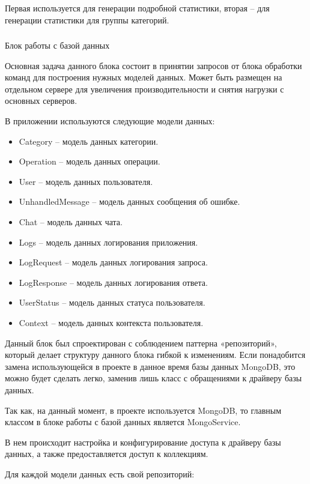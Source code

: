 Первая используется для генерации подробной статистики, вторая – для
генерации статистики для группы категорий.

\subsubsection{} Блок работы с базой данных
\label{sec:design:server:db}

Основная задача данного блока состоит в принятии запросов от блока
обработки команд для построения нужных моделей данных. Может быть
размещен на отдельном сервере для увеличения производительности и снятия нагрузки с основных серверов.

В приложении используются следующие модели данных:

\begin{itemize}
	\item Category – модель данных категории.
	\item Operation – модель данных операции.
	\item User – модель данных пользователя.
	\item UnhandledMessage – модель данных сообщения об ошибке.
	\item Chat – модель данных чата.
	\item Logs – модель данных логирования приложения.
	\item LogRequest – модель данных логирования запроса.
	\item LogResponse – модель данных логирования ответа.
	\item UserStatus – модель данных статуса пользователя.
	\item Context – модель данных контекста пользователя.
\end{itemize}

Данный блок был спроектирован с соблюдением паттерна «репозиторий», который делает структуру данного блока гибкой к изменениям. Если понадобится замена использующейся в проекте в данное время базы данных MongoDB, это можно будет сделать легко, заменив лишь класс с обращениями к драйверу базы данных.

Так как, на данный момент, в проекте используется MongoDB, то главным классом в блоке работы с базой данных является MongoService.

В нем происходит настройка и конфигурирование доступа к драйверу базы данных, а также предоставляется доступ к коллекциям.

Для каждой модели данных есть свой репозиторий:

